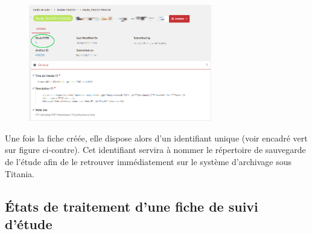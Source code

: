 \begin{minipage}[c]{0.5\linewidth}
   \begin{figure}[H]
      \centering
      \includegraphics[width=8cm]{pictures/GEA-identification.png}
      \vspace*{0.2cm}
   \end{figure}
\end{minipage} \hfill
\begin{minipage}[c]{0.45\linewidth}
Une fois la fiche créée, elle dispose alors d'un identifiant unique (voir encadré vert sur figure ci-contre). Cet identifiant servira à nommer le répertoire de sauvegarde de l'étude afin de le retrouver immédiatement sur le système d'archivage sous Titania.

\end{minipage}


\subsection{États de traitement d'une fiche de suivi d'étude}

